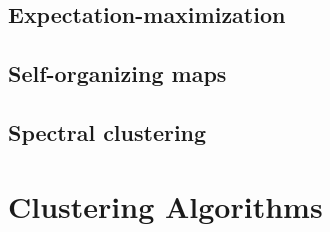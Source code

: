 \subsection{Expectation-maximization}

\subsection{Self-organizing maps}

\subsection{Spectral clustering}

\section{Clustering Algorithms}

